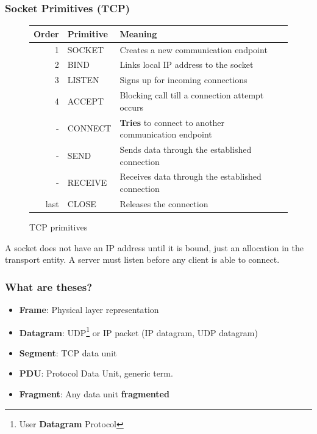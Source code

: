   \begin{frame}
    \frametitle{Socket Primitives (TCP)}
    \begin{figure}
      \centering
      \resizebox{10cm}{!} {
        \begin{tabular}{r|l|l}
          Order & Primitive & Meaning \\ \hline
          1     & SOCKET    & Creates a new communication endpoint \\ \hline
          2     & BIND      & Links local IP address to the socket \\ \hline
          3     & LISTEN    & Signs up for incoming connections \\ \hline
          4     & ACCEPT    & Blocking call till a connection attempt occurs \\ \hline
          -     & CONNECT   & \textbf{Tries} to connect to another communication endpoint \\ \hline
          -     & SEND      & Sends data through the established connection \\ \hline
          -     & RECEIVE   & Receives data through the established connection \\ \hline
          last  & CLOSE     & Releases the connection \\ \hline
        \end{tabular}
      }
      \caption{TCP primitives}
      \label{fig:primitives}
    \end{figure}
    A socket does not have an IP address until it is bound, just an allocation in the transport entity. A server must listen before any client is able to connect.
  \end{frame}

  \begin{frame}
    \frametitle{What are theses?}
      \begin{itemize}
        \item \textbf{Frame}: Physical layer representation
        \item \textbf{Datagram}: UDP\footnote{User \textbf{Datagram} Protocol} or IP packet (IP datagram, UDP datagram)
        \item \textbf{Segment}: TCP data unit
        \item \textbf{PDU}: Protocol Data Unit, generic term.
        \item \textbf{Fragment}: Any data unit \textbf{fragmented}
      \end{itemize}
  \end{frame}
